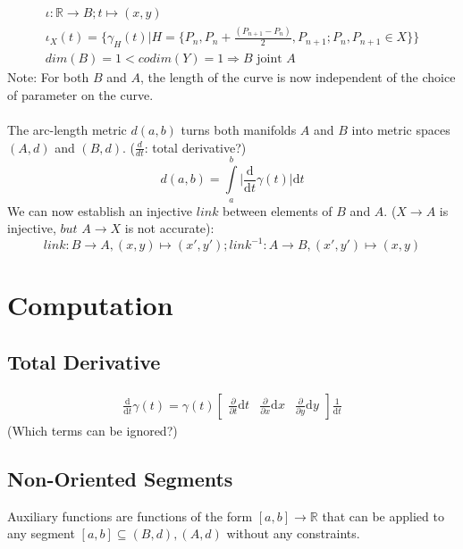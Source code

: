 \documentclass{article}
\begin{document}
\begin{align}
\iota: \mathbb{R} \rightarrow B; t \mapsto (x,y)\\
\iota_{X}(t) = \{ \gamma_{H}(t)\lvert H=\{P_{n},P_{n}+\frac{(P_{n+1}-P_{n})}{2},P_{n+1}; P_{n}, P_{n+1} \in X\}\}\\
dim(B)=1<codim(Y)=1 \Rightarrow B \text{ joint } A
\end{align}
Note: For both $B$ and $A$, the length of the curve is now independent of the choice of parameter on the curve. ~\cite[]{Taimanov}\\\\
The arc-length metric $d(a,b)$ turns both manifolds $A$ and $B$ into metric spaces $(A,d)$ and $(B,d)$. ($\frac{d}{dt}$: total derivative?)
\begin{equation}
d(a,b) = \int \limits _{a}^{b}\lvert \frac{\mathrm{d}}{\mathrm{d}t}\gamma(t)\rvert \mathrm{d}t
\end{equation}
We can now establish an injective $link$ between elements of $B$ and $A$. ($X \rightarrow A$ is injective, $but$ $A \rightarrow X$ is not accurate):
\begin{equation}
link: B \rightarrow A, (x,y) \mapsto (x',y'); link^{-1}: A \rightarrow B, (x',y') \mapsto (x,y)
\end{equation}
\section{Computation}

\subsection{Total Derivative}
\begin{align}
\frac{\mathrm{d}}{\mathrm{d} t} \gamma (t) = \gamma(t) \begin{bmatrix} \frac{\partial}{\partial t} \mathrm{d} t & \frac{\partial}{\partial x}  \mathrm{d} x & \frac{\partial}{\partial y} \mathrm{d} y \end{bmatrix} \frac{1}{\mathrm{d}t}
\end{align}
(Which terms can be ignored?)

\subsection{Non-Oriented Segments}

Auxiliary functions are functions of the form $[a,b] \rightarrow \mathbb{R}$ that can be applied to any segment $[a,b] \subseteq (B,d),(A,d)$ without any constraints.
\end{document}

